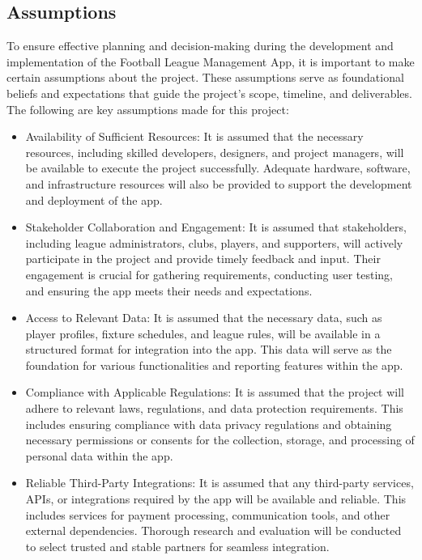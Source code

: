 \documentclass[12pt]{article}
\begin{document}
\subsection{Assumptions}
To ensure effective planning and decision-making during the development and implementation of the Football League Management App, it is important to make certain assumptions about the project. These assumptions serve as foundational beliefs and expectations that guide the project's scope, timeline, and deliverables. The following are key assumptions made for this project:
\begin{itemize}
    \item Availability of Sufficient Resources: It is assumed that the necessary resources, including skilled developers, designers, and project managers, will be available to execute the project successfully. Adequate hardware, software, and infrastructure resources will also be provided to support the development and deployment of the app.

    \item Stakeholder Collaboration and Engagement: It is assumed that stakeholders, including league administrators, clubs, players, and supporters, will actively participate in the project and provide timely feedback and input. Their engagement is crucial for gathering requirements, conducting user testing, and ensuring the app meets their needs and expectations.

    \item Access to Relevant Data: It is assumed that the necessary data, such as player profiles, fixture schedules, and league rules, will be available in a structured format for integration into the app. This data will serve as the foundation for various functionalities and reporting features within the app.

    \item Compliance with Applicable Regulations: It is assumed that the project will adhere to relevant laws, regulations, and data protection requirements. This includes ensuring compliance with data privacy regulations and obtaining necessary permissions or consents for the collection, storage, and processing of personal data within the app.

    \item Reliable Third-Party Integrations: It is assumed that any third-party services, APIs, or integrations required by the app will be available and reliable. This includes services for payment processing, communication tools, and other external dependencies. Thorough research and evaluation will be conducted to select trusted and stable partners for seamless integration.


\end{itemize}
\end{document}
